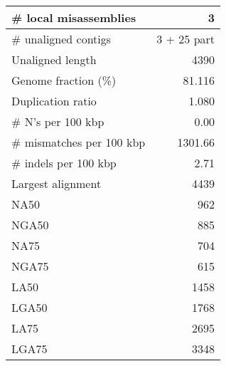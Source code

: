 \documentclass[12pt,a4paper]{article}
\begin{document}
\begin{table}[ht]
\begin{center}
\begin{tabular}{|l*{1}{|r}|}
\# local misassemblies & 3 \\ \hline
\# unaligned contigs & 3 + 25 part \\ \hline
Unaligned length & 4390 \\ \hline
Genome fraction (\%) & 81.116 \\ \hline
Duplication ratio & 1.080 \\ \hline
\# N's per 100 kbp & 0.00 \\ \hline
\# mismatches per 100 kbp & 1301.66 \\ \hline
\# indels per 100 kbp & 2.71 \\ \hline
Largest alignment & 4439 \\ \hline
NA50 & 962 \\ \hline
NGA50 & 885 \\ \hline
NA75 & 704 \\ \hline
NGA75 & 615 \\ \hline
LA50 & 1458 \\ \hline
LGA50 & 1768 \\ \hline
LA75 & 2695 \\ \hline
LGA75 & 3348 \\ \hline
\end{tabular}
\end{center}
\end{table}
\end{document}
